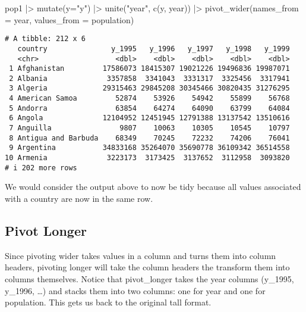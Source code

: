 \documentclass[
  letterpaper,
  DIV=11,
  numbers=noendperiod]{scrreprt}
\newenvironment{Shaded}{\begin{snugshade}}{\end{snugshade}}
\newcommand{\AttributeTok}[1]{\textcolor[rgb]{0.40,0.45,0.13}{#1}}
\newcommand{\FunctionTok}[1]{\textcolor[rgb]{0.28,0.35,0.67}{#1}}
\newcommand{\NormalTok}[1]{\textcolor[rgb]{0.00,0.23,0.31}{#1}}
\newcommand{\SpecialCharTok}[1]{\textcolor[rgb]{0.37,0.37,0.37}{#1}}
\newcommand{\StringTok}[1]{\textcolor[rgb]{0.13,0.47,0.30}{#1}}
\begin{document}
\begin{Shaded}
\begin{Highlighting}[]
\NormalTok{pop1 }\SpecialCharTok{|\textgreater{}} \FunctionTok{mutate}\NormalTok{(}\AttributeTok{y=}\StringTok{"y"}\NormalTok{) }\SpecialCharTok{|\textgreater{}} \FunctionTok{unite}\NormalTok{(}\StringTok{"year"}\NormalTok{, }\FunctionTok{c}\NormalTok{(y, year)) }\SpecialCharTok{|\textgreater{}}
    \FunctionTok{pivot\_wider}\NormalTok{(}\AttributeTok{names\_from =}\NormalTok{ year, }\AttributeTok{values\_from =}\NormalTok{ population)}
\end{Highlighting}
\end{Shaded}

\begin{verbatim}
# A tibble: 212 x 6
   country               y_1995   y_1996   y_1997   y_1998   y_1999
   <chr>                  <dbl>    <dbl>    <dbl>    <dbl>    <dbl>
 1 Afghanistan         17586073 18415307 19021226 19496836 19987071
 2 Albania              3357858  3341043  3331317  3325456  3317941
 3 Algeria             29315463 29845208 30345466 30820435 31276295
 4 American Samoa         52874    53926    54942    55899    56768
 5 Andorra                63854    64274    64090    63799    64084
 6 Angola              12104952 12451945 12791388 13137542 13510616
 7 Anguilla                9807    10063    10305    10545    10797
 8 Antigua and Barbuda    68349    70245    72232    74206    76041
 9 Argentina           34833168 35264070 35690778 36109342 36514558
10 Armenia              3223173  3173425  3137652  3112958  3093820
# i 202 more rows
\end{verbatim}

We would consider the output above to now be tidy because all values
associated with a country are now in the same row.

\subsection{Pivot Longer}\label{pivot-longer}

Since pivoting wider takes values in a column and turns them into column
headers, pivoting longer will take the column headers the transform them
into columns themselves. Notice that pivot\_longer takes the year
columns (y\_1995, y\_1996, \ldots) and stacks them into two columns: one
for year and one for population. This gets us back to the original tall
format.
\end{document}
